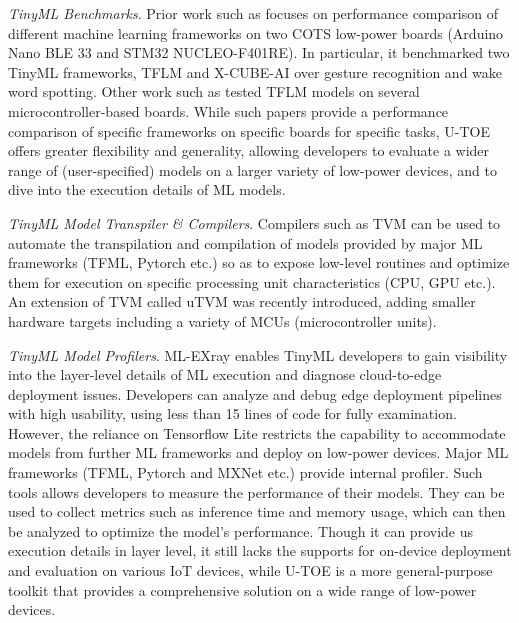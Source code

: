  \emph{TinyML Benchmarks}. 
Prior work such as \cite{osman2022tinyml-bench} focuses on performance comparison of different machine learning frameworks on two COTS low-power boards (Arduino Nano BLE 33 and STM32 NUCLEO-F401RE). In particular, it benchmarked two TinyML frameworks, TFLM and X-CUBE-AI over gesture recognition and wake word spotting. Other work such as \cite{sudharsan2021tinyml-bench} tested TFLM models on several microcontroller-based boards. While such papers provide a performance comparison of specific frameworks on specific boards for specific tasks, U-TOE offers greater flexibility and generality, allowing developers to evaluate a wider range of (user-specified) models on a larger variety of low-power devices, and to dive into the execution details of ML models.
 
\emph{TinyML Model Transpiler \& Compilers}.
Compilers such as TVM \cite{chen2018tvm} can be used to automate the transpilation and compilation of models provided by major ML frameworks (TFML, Pytorch etc.) so as to expose low-level routines and optimize them for execution on specific processing unit characteristics (CPU, GPU etc.). An extension of TVM called uTVM was recently introduced, adding smaller hardware targets including a variety of MCUs (microcontroller units).

\emph{TinyML Model Profilers}.
ML-EXray\cite{qiu2022ml-xray} enables TinyML developers to gain visibility into the layer-level details of ML execution and diagnose cloud-to-edge deployment issues. Developers can analyze and debug edge deployment pipelines with high usability, using less than 15 lines of code for fully examination. However, the reliance on Tensorflow Lite restricts the capability to accommodate models from further ML frameworks and deploy on low-power devices.
Major ML frameworks (TFML, Pytorch and MXNet etc.) provide internal profiler. Such tools allows developers to measure the performance of their models. They can be used to collect metrics such as inference time and memory usage, which can then be analyzed to optimize the model's performance. Though it can provide us execution details in layer level, it still lacks the supports for on-device deployment and evaluation on various IoT devices, while U-TOE is a more general-purpose toolkit that provides a comprehensive solution on a wide range of low-power devices.
